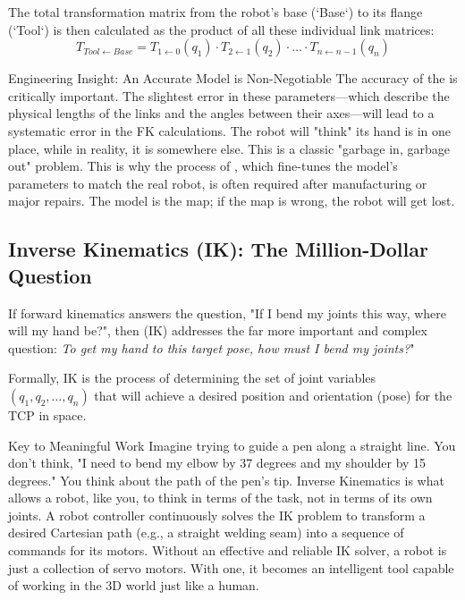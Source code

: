 The total transformation matrix from the robot's base (`Base`) to its flange (`Tool`) is then calculated as the product of all these individual link matrices:
$$ T_{Tool \leftarrow Base} = T_{1 \leftarrow 0}(q_1) \cdot T_{2 \leftarrow 1}(q_2) \cdot \dots \cdot T_{n \leftarrow n-1}(q_n) $$

\begin{tipbox}{Engineering Insight: An Accurate Model is Non-Negotiable}
The accuracy of the  is critically important. The slightest error in these parameters—which describe the physical lengths of the links and the angles between their axes—will lead to a systematic error in the FK calculations. The robot will "think" its hand is in one place, while in reality, it is somewhere else. This is a classic "garbage in, garbage out" problem. This is why the process of , which fine-tunes the model's parameters to match the real robot, is often required after manufacturing or major repairs. The model is the map; if the map is wrong, the robot will get lost.
\end{tipbox}

\subsection{Inverse Kinematics (IK): The Million-Dollar Question}
\label{sec:ik}

If forward kinematics answers the question, "If I bend my joints this way, where will my hand be?", then  (IK) addresses the far more important and complex question: \textit{To get my hand to this target pose, how must I bend my joints?}"

Formally, IK is the process of determining the set of joint variables $(q_1, q_2, \dots, q_n)$ that will achieve a desired position and orientation (pose) for the TCP in space.

\begin{tipbox}{Key to Meaningful Work}
Imagine trying to guide a pen along a straight line. You don't think, "I need to bend my elbow by 37 degrees and my shoulder by 15 degrees." You think about the path of the pen's tip. Inverse Kinematics is what allows a robot, like you, to think in terms of the task, not in terms of its own joints. A robot controller continuously solves the IK problem to transform a desired Cartesian path (e.g., a straight welding seam) into a sequence of commands for its motors. Without an effective and reliable IK solver, a robot is just a collection of servo motors. With one, it becomes an intelligent tool capable of working in the 3D world just like a human.
\end{tipbox}

